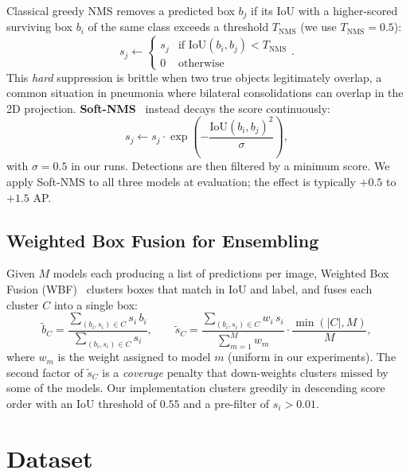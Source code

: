 \documentclass[11pt,a4paper]{article}
\begin{document}
Classical greedy NMS removes a predicted box $b_j$ if its IoU with a higher-scored surviving box $b_i$ of the same class exceeds a threshold $T_{\text{NMS}}$ (we use $T_{\text{NMS}} = 0.5$):
\begin{equation}
    s_j \leftarrow \begin{cases} s_j & \text{if } \mathrm{IoU}(b_i, b_j) < T_{\text{NMS}} \\ 0 & \text{otherwise} \end{cases}.
\end{equation}
This \emph{hard} suppression is brittle when two true objects legitimately overlap, a common situation in pneumonia where bilateral consolidations can overlap in the 2D projection. \textbf{Soft-NMS}~\cite{bodla2017softnms} instead decays the score continuously:
\begin{equation}
    s_j \leftarrow s_j \cdot \exp\!\left(-\frac{\mathrm{IoU}(b_i, b_j)^2}{\sigma}\right),
\end{equation}
with $\sigma = 0.5$ in our runs. Detections are then filtered by a minimum score. We apply Soft-NMS to all three models at evaluation; the effect is typically $+0.5$ to $+1.5$ AP.

\subsection{Weighted Box Fusion for Ensembling}

Given $M$ models each producing a list of predictions per image, Weighted Box Fusion (WBF)~\cite{solovyev2021wbf} clusters boxes that match in IoU and label, and fuses each cluster $C$ into a single box:
\begin{equation}
    \tilde b_C = \frac{\sum_{(b_i, s_i) \in C} s_i \, b_i}{\sum_{(b_i, s_i) \in C} s_i},
    \qquad
    \tilde s_C = \frac{\sum_{(b_i, s_i) \in C} w_i \, s_i}{\sum_{m=1}^{M} w_m} \cdot \frac{\min(|C|, M)}{M},
\end{equation}
where $w_m$ is the weight assigned to model $m$ (uniform in our experiments). The second factor of $\tilde s_C$ is a \emph{coverage} penalty that down-weights clusters missed by some of the models. Our implementation clusters greedily in descending score order with an IoU threshold of $0.55$ and a pre-filter of $s_i > 0.01$.
\pagebreak

\section{Dataset}
\label{sec:dataset}
\end{document}
